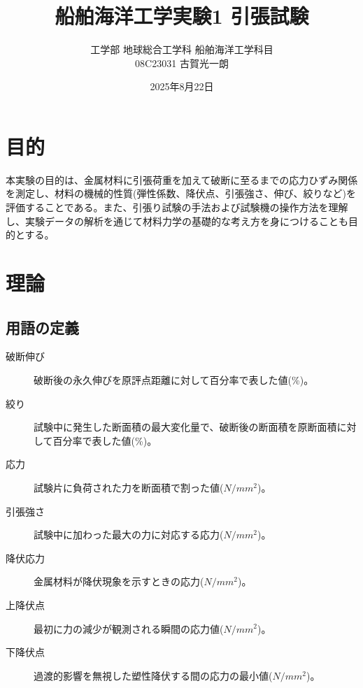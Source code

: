 \documentclass[11pt, a4paper, dvipdfmx]{jsreport}
\title{船舶海洋工学実験1 引張試験}
\author{工学部 地球総合工学科 船舶海洋工学科目 \\ 08C23031 古賀光一朗}
\date{2025年8月22日}
\begin{document}
\maketitle
\tableofcontents
\newpage

\section{目的}
本実験の目的は、金属材料に引張荷重を加えて破断に至るまでの応力ひずみ関係を測定し、材料の機械的性質(弾性係数、降伏点、引張強さ、伸び、絞りなど)を評価することである。また、引張り試験の手法および試験機の操作方法を理解し、実験データの解析を通じて材料力学の基礎的な考え方を身につけることも目的とする。

\section{理論}
\subsection{用語の定義}
\begin{description}
    \item[破断伸び] 破断後の永久伸びを原評点距離に対して百分率で表した値(\%)。
    \item[絞り] 試験中に発生した断面積の最大変化量で、破断後の断面積を原断面積に対して百分率で表した値(\%)。
    \item[応力] 試験片に負荷された力を断面積で割った値($N/mm^2$)。
    \item[引張強さ] 試験中に加わった最大の力に対応する応力($N/mm^2$)。
    \item[降伏応力] 金属材料が降伏現象を示すときの応力($N/mm^2$)。
    \item[上降伏点] 最初に力の減少が観測される瞬間の応力値($N/mm^2$)。
    \item[下降伏点] 過渡的影響を無視した塑性降伏する間の応力の最小値($N/mm^2$)。
\end{description}
\end{document}
